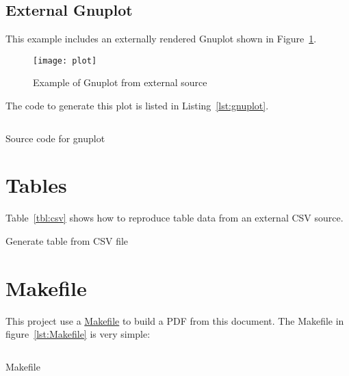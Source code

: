 \documentclass[10pt,a4paper]{article}
\begin{document}
\subsection*{External Gnuplot}
This example includes an externally rendered Gnuplot shown in
Figure~\ref{fig:gnuplot}.
\begin{figure}
  \centering
  \texttt{[image: plot]}
  \caption{Example of Gnuplot from external source\label{fig:gnuplot}}
\end{figure}
The code to generate this plot is listed in Listing~\ref{lst:gnuplot}.
\begin{listing}
  \inputminted{gnuplot}{plot.gnuplot}
  \caption{Source code for gnuplot\label{lst:gnuplot}}
\end{listing}

\sectionbreak{}

\section*{Tables}
Table~\ref{tbl:csv} shows how to reproduce table data from an external CSV
source.
\begin{table}
  \begin{center}
    \caption{Generate table from CSV file\label{tbl:csv}}
  \end{center}
\end{table}

\lipsum[3]

\sectionbreak{}

\section*{Makefile}

This project use a \href{https://www.gnu.org/software/make/}{Makefile} to build
a PDF from this document. The Makefile in figure~\ref{lst:Makefile} is very
simple:

\begin{listing}
  \inputminted{make}{Makefile}
  \caption{Makefile\label{lst:Makefile}}
\end{listing}
\end{document}
